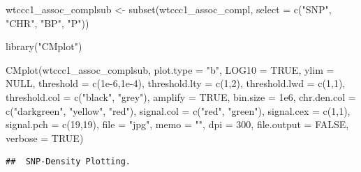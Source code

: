 \documentclass[
]{book}
\newenvironment{Shaded}{\begin{snugshade}}{\end{snugshade}}
\newcommand{\AttributeTok}[1]{\textcolor[rgb]{0.77,0.63,0.00}{#1}}
\newcommand{\ConstantTok}[1]{\textcolor[rgb]{0.00,0.00,0.00}{#1}}
\newcommand{\DecValTok}[1]{\textcolor[rgb]{0.00,0.00,0.81}{#1}}
\newcommand{\FloatTok}[1]{\textcolor[rgb]{0.00,0.00,0.81}{#1}}
\newcommand{\FunctionTok}[1]{\textcolor[rgb]{0.00,0.00,0.00}{#1}}
\newcommand{\NormalTok}[1]{#1}
\newcommand{\OtherTok}[1]{\textcolor[rgb]{0.56,0.35,0.01}{#1}}
\newcommand{\StringTok}[1]{\textcolor[rgb]{0.31,0.60,0.02}{#1}}
\begin{document}
\begin{Shaded}
\begin{Highlighting}[]
\NormalTok{wtccc1\_assoc\_complsub }\OtherTok{\textless{}{-}} \FunctionTok{subset}\NormalTok{(wtccc1\_assoc\_compl, }\AttributeTok{select =} \FunctionTok{c}\NormalTok{(}\StringTok{"SNP"}\NormalTok{, }\StringTok{"CHR"}\NormalTok{, }\StringTok{"BP"}\NormalTok{, }\StringTok{"P"}\NormalTok{))}
\end{Highlighting}
\end{Shaded}

\begin{Shaded}
\begin{Highlighting}[]
\FunctionTok{library}\NormalTok{(}\StringTok{"CMplot"}\NormalTok{)}

\FunctionTok{CMplot}\NormalTok{(wtccc1\_assoc\_complsub,}
       \AttributeTok{plot.type =} \StringTok{"b"}\NormalTok{, }\AttributeTok{LOG10 =} \ConstantTok{TRUE}\NormalTok{, }\AttributeTok{ylim =} \ConstantTok{NULL}\NormalTok{,}
       \AttributeTok{threshold =} \FunctionTok{c}\NormalTok{(}\FloatTok{1e{-}6}\NormalTok{,}\FloatTok{1e{-}4}\NormalTok{), }\AttributeTok{threshold.lty =} \FunctionTok{c}\NormalTok{(}\DecValTok{1}\NormalTok{,}\DecValTok{2}\NormalTok{), }\AttributeTok{threshold.lwd =} \FunctionTok{c}\NormalTok{(}\DecValTok{1}\NormalTok{,}\DecValTok{1}\NormalTok{), }\AttributeTok{threshold.col =} \FunctionTok{c}\NormalTok{(}\StringTok{"black"}\NormalTok{, }\StringTok{"grey"}\NormalTok{),}
       \AttributeTok{amplify =} \ConstantTok{TRUE}\NormalTok{,}
       \AttributeTok{bin.size =} \FloatTok{1e6}\NormalTok{, }\AttributeTok{chr.den.col =} \FunctionTok{c}\NormalTok{(}\StringTok{"darkgreen"}\NormalTok{, }\StringTok{"yellow"}\NormalTok{, }\StringTok{"red"}\NormalTok{),}
       \AttributeTok{signal.col =} \FunctionTok{c}\NormalTok{(}\StringTok{"red"}\NormalTok{, }\StringTok{"green"}\NormalTok{), }\AttributeTok{signal.cex =} \FunctionTok{c}\NormalTok{(}\DecValTok{1}\NormalTok{,}\DecValTok{1}\NormalTok{), }\AttributeTok{signal.pch =} \FunctionTok{c}\NormalTok{(}\DecValTok{19}\NormalTok{,}\DecValTok{19}\NormalTok{),}
       \AttributeTok{file =} \StringTok{"jpg"}\NormalTok{, }\AttributeTok{memo =} \StringTok{""}\NormalTok{, }\AttributeTok{dpi =} \DecValTok{300}\NormalTok{, }\AttributeTok{file.output =} \ConstantTok{FALSE}\NormalTok{, }\AttributeTok{verbose =} \ConstantTok{TRUE}\NormalTok{)}
\end{Highlighting}
\end{Shaded}

\begin{verbatim}
##  SNP-Density Plotting.
\end{verbatim}
\end{document}
